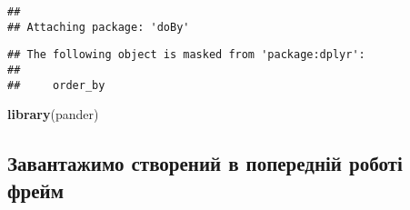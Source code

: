 \documentclass[
]{article}
\newenvironment{Shaded}{\begin{snugshade}}{\end{snugshade}}
\newcommand{\DataTypeTok}[1]{\textcolor[rgb]{0.13,0.29,0.53}{#1}}
\newcommand{\DecValTok}[1]{\textcolor[rgb]{0.00,0.00,0.81}{#1}}
\newcommand{\KeywordTok}[1]{\textcolor[rgb]{0.13,0.29,0.53}{\textbf{#1}}}
\newcommand{\NormalTok}[1]{#1}
\newcommand{\OperatorTok}[1]{\textcolor[rgb]{0.81,0.36,0.00}{\textbf{#1}}}
\newcommand{\OtherTok}[1]{\textcolor[rgb]{0.56,0.35,0.01}{#1}}
\newcommand{\StringTok}[1]{\textcolor[rgb]{0.31,0.60,0.02}{#1}}
\begin{document}
\begin{verbatim}
## 
## Attaching package: 'doBy'
\end{verbatim}

\begin{verbatim}
## The following object is masked from 'package:dplyr':
## 
##     order_by
\end{verbatim}

\begin{Shaded}
\begin{Highlighting}[]
\KeywordTok{library}\NormalTok{(pander)}
\end{Highlighting}
\end{Shaded}

\hypertarget{ux437ux430ux432ux430ux43dux442ux430ux436ux438ux43cux43e-ux441ux442ux432ux43eux440ux435ux43dux438ux439-ux432-ux43fux43eux43fux435ux440ux435ux434ux43dux456ux439-ux440ux43eux431ux43eux442ux456-ux444ux440ux435ux439ux43c}{%
\subsection{Завантажимо створений в попередній роботі
фрейм}\label{ux437ux430ux432ux430ux43dux442ux430ux436ux438ux43cux43e-ux441ux442ux432ux43eux440ux435ux43dux438ux439-ux432-ux43fux43eux43fux435ux440ux435ux434ux43dux456ux439-ux440ux43eux431ux43eux442ux456-ux444ux440ux435ux439ux43c}}

\begin{Shaded}
\end{Shaded}
\end{document}
